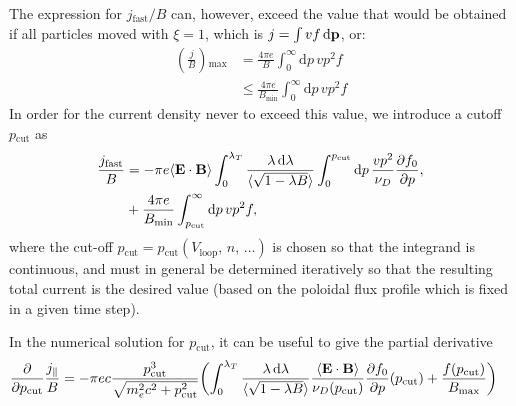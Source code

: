 \documentclass[11pt,a4paper]{article}
\newcommand{\rd}{\ensuremath{\mathrm{d}}}
\newcommand{\sub}[1]{\ensuremath{_{\text{#1}}}}
\renewcommand{\b}[1]{\ensuremath{ {\bf #1 } }}
\begin{document}
The expression for $j\sub{fast}/B$ can, however, exceed the value that would be obtained if all particles moved with $\xi=1$, which is $j=\int vf \,\rd\b{p}$, or:
\begin{align}
\left(\frac{j}{B}\right)\sub{max} &= \frac{4\pi e}{B} \int_0^\infty \rd p \,vp^2 f  \nonumber \\
&\leq  \frac{4\pi e}{B\sub{min}} \int_0^\infty \rd p \,vp^2 f 
\end{align}
In order for the current density never to exceed this value, we introduce a cutoff $p\sub{cut}$ as
\begin{align}
\frac{j\sub{fast}}{B} &=-\pi  e\langle \b{E}\cdot\b{B}\rangle \int_0^{\lambda_T}\frac{\lambda\,\rd \lambda}{\langle\sqrt{1-\lambda B}\rangle}\int_0^{p\sub{cut}} \rd p \, \frac{vp^2}{\nu_D}\frac{\partial f_0}{\partial p}, \nonumber \\
&+\frac{4\pi e }{B\sub{min}} \int_{p\sub{cut}}^\infty \rd p \,vp^2f,
\end{align}
where the cut-off $p\sub{cut} = p\sub{cut}(V\sub{loop},\,n,\,...)$ is chosen so that the integrand is continuous, and must in general be determined iteratively so that the resulting total current is the desired value (based on the poloidal flux profile which is fixed in a given time step).

In the numerical solution for $p\sub{cut}$, it can be useful to give the partial derivative
\begin{align}
\frac{\partial}{\partial p\sub{cut}} \frac{j_\parallel}{B} &= -\pi e c \frac{p\sub{cut}^3}{\sqrt{m_e^2 c^2+p\sub{cut}^2}} \biggl( %
\int_0^{\lambda_T}\frac{\lambda\,\rd \lambda}{\langle\sqrt{1-\lambda B}\rangle} \frac{\langle\b{E}\cdot\b{B}\rangle  }{\nu_D(p\sub{cut})}\frac{\partial f_0}{\partial p}(p\sub{cut}) 
 + \frac{f(p\sub{cut})  }{B\sub{max}}\biggr)
\end{align}
\end{document}
